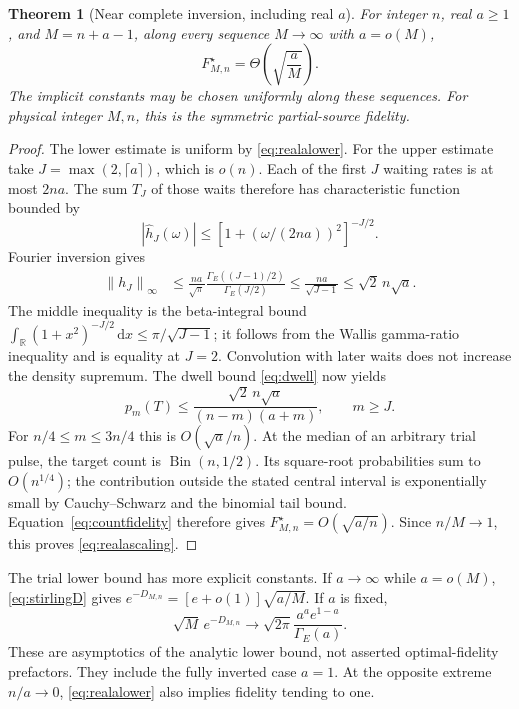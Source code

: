 \documentclass[11pt,a4paper]{article}
\newtheorem{theorem}{Theorem}
\newcommand{\GE}{\Gamma_{\!E}}
\newcommand{\norm}[1]{\left\lVert#1\right\rVert}
\newcommand{\dd}{\,\mathrm d}
\newcommand{\Bin}{\operatorname{Bin}}
\begin{document}
\begin{theorem}[Near complete inversion, including real \(a\)]
\label{thm:partial}
For integer \(n\), real \(a\ge1\), and \(M=n+a-1\), along every
sequence \(M\to\infty\) with \(a=o(M)\),
\begin{equation}
 \boxed{F_{M,n}^\star=\Theta\!\left(\sqrt{\frac aM}\right).}
 \label{eq:realascaling}
\end{equation}
The implicit constants may be chosen uniformly along these
sequences. For physical integer \(M,n\), this is the symmetric
partial-source fidelity.
\end{theorem}
\begin{proof}
The lower estimate is uniform by \eqref{eq:realalower}.
For the upper estimate take \(J=\max(2,\lceil a\rceil)\), which is
\(o(n)\). Each of the first \(J\) waiting rates is at most \(2na\).
The sum \(T_J\) of those waits therefore has characteristic function
bounded by
\begin{equation}
 |\widehat h_J(\omega)|
 \le[1+(\omega/(2na))^2]^{-J/2}.
\end{equation}
Fourier inversion gives
\begin{align}
 \norm{h_J}_\infty
 &\le\frac{na}{\sqrt\pi}
 \frac{\GE((J-1)/2)}{\GE(J/2)}
 \le\frac{na}{\sqrt{J-1}}
 \le\sqrt2\,n\sqrt a.
 \label{eq:fourierbound}
\end{align}
The middle inequality is the beta-integral bound
\(\int_{\mathbb R}(1+x^2)^{-J/2}\dd x\le\pi/\sqrt{J-1}\);
it follows from the Wallis gamma-ratio inequality and is equality
at \(J=2\). Convolution with later waits does not increase the
density supremum. The dwell bound \eqref{eq:dwell} now yields
\begin{equation}
 p_m(T)\le
 \frac{\sqrt2\,n\sqrt a}{(n-m)(a+m)},\qquad m\ge J.
\end{equation}
For \(n/4\le m\le3n/4\) this is \(O(\sqrt a/n)\).
At the median of an arbitrary trial pulse, the target count is
\(\Bin(n,1/2)\). Its square-root probabilities sum to
\(O(n^{1/4})\); the contribution outside the stated central
interval is exponentially small by Cauchy--Schwarz and the
binomial tail bound. Equation~\eqref{eq:countfidelity} therefore
gives \(F_{M,n}^\star=O(\sqrt{a/n})\).
Since \(n/M\to1\), this proves \eqref{eq:realascaling}.
\end{proof}

The trial lower bound has more explicit constants. If
\(a\to\infty\) while \(a=o(M)\), \eqref{eq:stirlingD} gives
\(e^{-D_{M,n}}=[e+o(1)]\sqrt{a/M}\). If \(a\) is fixed,
\begin{equation}
 \sqrt M\,e^{-D_{M,n}}\longrightarrow
 \sqrt{2\pi}\frac{a^a e^{1-a}}{\GE(a)}.
 \label{eq:fixedalower}
\end{equation}
These are asymptotics of the analytic lower bound, not asserted
optimal-fidelity prefactors. They include the fully inverted
case \(a=1\). At the opposite extreme \(n/a\to0\),
\eqref{eq:realalower} also implies fidelity tending to one.
\end{document}
